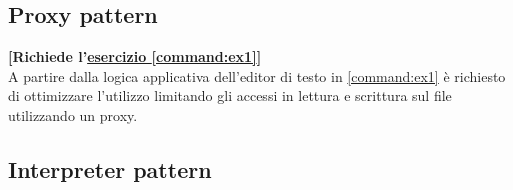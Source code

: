 \documentclass[12pt,a4paper]{article}
\begin{document}
    \subsection{Proxy pattern}\label{pattern:proxy}
    \begin{Exercise}
    \small\textbf{[Richiede l'\hyperref[command:ex1]{esercizio \ref{command:ex1}}]}\\
    A partire dalla logica applicativa dell'editor di testo in \hyperref[command:ex1]{\ref{command:ex1}} è richiesto di ottimizzare l'utilizzo limitando gli accessi in lettura e scrittura sul file utilizzando un proxy.
    \end{Exercise}
    

    
    \subsection{Interpreter pattern}\label{pattern:interpreter}
	\newcommand{\alt}[0]{{\;|\;}}    
    
\end{document}
